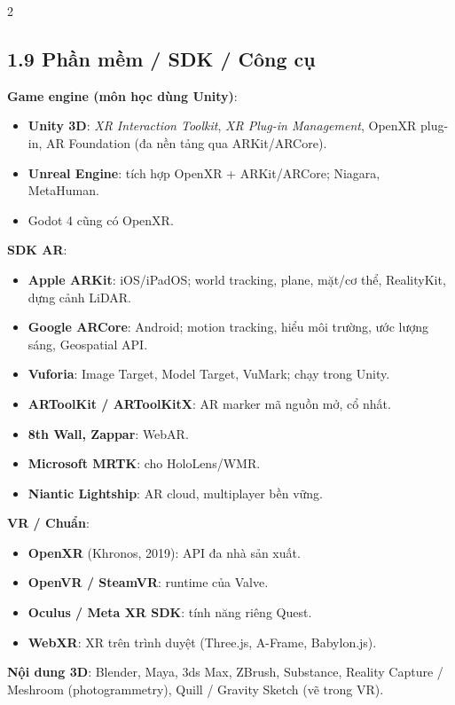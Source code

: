 \begin{paracol}{2}
\switchcolumn

\subsection*{1.9 Phần mềm / SDK / Công cụ}
\textbf{Game engine (môn học dùng Unity)}:
\begin{itemize}[leftmargin=*,nosep]
  \item \textbf{Unity 3D}: \emph{XR Interaction Toolkit}, \emph{XR Plug-in Management}, OpenXR plug-in, AR Foundation (đa nền tảng qua ARKit/ARCore).
  \item \textbf{Unreal Engine}: tích hợp OpenXR + ARKit/ARCore; Niagara, MetaHuman.
  \item Godot 4 cũng có OpenXR.
\end{itemize}
\textbf{SDK AR}:
\begin{itemize}[leftmargin=*,nosep]
  \item \textbf{Apple ARKit}: iOS/iPadOS; world tracking, plane, mặt/cơ thể, RealityKit, dựng cảnh LiDAR.
  \item \textbf{Google ARCore}: Android; motion tracking, hiểu môi trường, ước lượng sáng, Geospatial API.
  \item \textbf{Vuforia}: Image Target, Model Target, VuMark; chạy trong Unity.
  \item \textbf{ARToolKit / ARToolKitX}: AR marker mã nguồn mở, cổ nhất.
  \item \textbf{8th Wall, Zappar}: WebAR.
  \item \textbf{Microsoft MRTK}: cho HoloLens/WMR.
  \item \textbf{Niantic Lightship}: AR cloud, multiplayer bền vững.
\end{itemize}
\textbf{VR / Chuẩn}:
\begin{itemize}[leftmargin=*,nosep]
  \item \textbf{OpenXR} (Khronos, 2019): API đa nhà sản xuất.
  \item \textbf{OpenVR / SteamVR}: runtime của Valve.
  \item \textbf{Oculus / Meta XR SDK}: tính năng riêng Quest.
  \item \textbf{WebXR}: XR trên trình duyệt (Three.js, A-Frame, Babylon.js).
\end{itemize}
\textbf{Nội dung 3D}: Blender, Maya, 3ds Max, ZBrush, Substance, Reality Capture / Meshroom (photogrammetry), Quill / Gravity Sketch (vẽ trong VR).

\switchcolumn*


\end{paracol}
